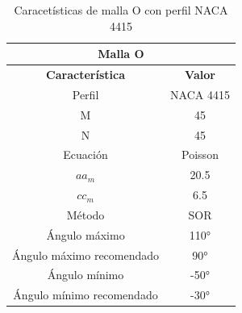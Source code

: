 \documentclass[letterpaper, openright, 12pt]{book}
\begin{document}
    \begin{table}[htbp!]
    \begin{center}
        \begin{tabular}{| c | c |}
        \hline
        \multicolumn{2}{|c|}{Malla O}\\

        \hline
        \textbf{Característica} & \textbf{Valor} \\ \hline

        Perfil & NACA 4415
        \\ \hline

        M & 45
        \\ \hline

        N & 45
        \\ \hline

        Ecuación & Poisson
        \\\hline

        $aa_m$ & 20.5
        \\ \hline

        $cc_m$ & 6.5
        \\ \hline

        Método & SOR
        \\\hline

        Ángulo máximo & 110\si{\degree}
        \\ \hline

        Ángulo máximo recomendado & 90\si{\degree}
        \\ \hline

        Ángulo mínimo & -50\si{\degree}
        \\ \hline

        Ángulo mínimo recomendado & -30\si{\degree}
        \\ \hline
        \end{tabular}
        \caption{Caracetísticas de malla O con perfil NACA 4415}
    \label{tabla_o_naca_4415}
    \end{center}
    \end{table}
\end{document}
